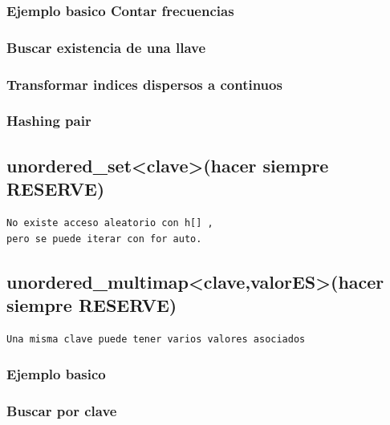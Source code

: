 \subsubsection{Ejemplo basico Contar frecuencias}
\raggedbottom
\hrulefill
\subsubsection{Buscar existencia de una llave}
\raggedbottom
\hrulefill
\subsubsection{Transformar indices dispersos a continuos}
\raggedbottom
\hrulefill
\subsubsection{Hashing pair}
\raggedbottom
\hrulefill
\subsection{unordered\_set\textless clave\textgreater (hacer siempre RESERVE)}
\begin{verbatim}
No existe acceso aleatorio con h[] ,
pero se puede iterar con for auto.
\end{verbatim}
\raggedbottom
\hrulefill

\subsection{unordered\_multimap\textless clave,valorES\textgreater (hacer siempre RESERVE)}
\begin{verbatim}
Una misma clave puede tener varios valores asociados
\end{verbatim}
\subsubsection{Ejemplo basico}
\raggedbottom
\hrulefill
\subsubsection{Buscar por clave}
\raggedbottom
\hrulefill
